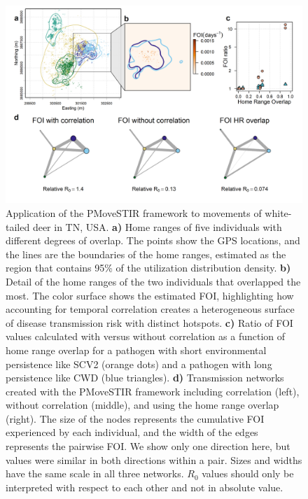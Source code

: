 \documentclass[letterpaper]{article}
\begin{document}
\begin{figure}
    \includegraphics[width=\textwidth]{figures/deer_results.png}
    \caption{\small Application of the PMoveSTIR framework to movements of white-tailed deer in TN, USA. \textbf{a)} Home ranges of five individuals with different degrees of overlap. The points show the GPS locations, and the lines are the boundaries of the home ranges, estimated as the region that contains 95\% of the utilization distribution density. \textbf{b)} Detail of the home ranges of the two individuals that overlapped the most. The color surface shows the estimated FOI, highlighting how accounting for temporal correlation creates a heterogeneous surface of disease transmission risk with distinct hotspots. \textbf{c)} Ratio of FOI values calculated with versus without correlation as a function of home range overlap for a pathogen with short environmental persistence like SCV2 (orange dots) and a pathogen with long persistence like CWD (blue triangles). \textbf{d)} Transmission networks created with the PMoveSTIR framework including correlation (left), without correlation (middle), and using the home range overlap (right). The size of the nodes represents the cumulative FOI experienced by each individual, and the width of the edges represents the pairwise FOI. We show only one direction here, but values were similar in both directions within a pair. Sizes and widths have the same scale in all three networks. $R_0$ values should only be interpreted with respect to each other and not in absolute value.}
  \label{fig:empiricalres}
\end{figure}
\end{document}
